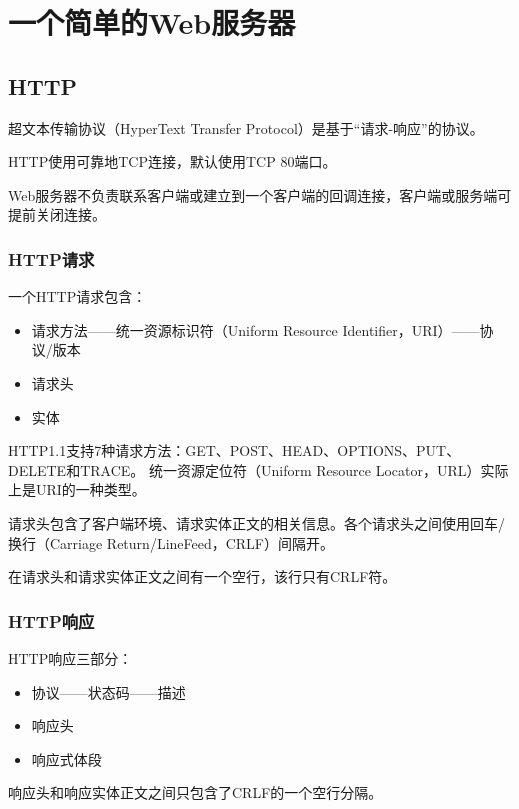 \chapter{一个简单的Web服务器}
\section{HTTP}
超文本传输协议（HyperText Transfer Protocol）是基于“请求-响应”的协议。
\par HTTP使用可靠地TCP连接，默认使用TCP 80端口。
\par Web服务器不负责联系客户端或建立到一个客户端的回调连接，客户端或服务端可提前关闭连接。
\subsection{HTTP请求}
一个HTTP请求包含：
\begin{itemize}
	\item 请求方法——统一资源标识符（Uniform Resource Identifier，URI）——协议/版本
	\item 请求头
	\item 实体
\end{itemize}
\par HTTP1.1支持7种请求方法：GET、POST、HEAD、OPTIONS、PUT、DELETE和TRACE。
统一资源定位符（Uniform Resource Locator，URL）实际上是URI的一种类型。
\par 请求头包含了客户端环境、请求实体正文的相关信息。各个请求头之间使用回车/换行（Carriage Return/LineFeed，CRLF）间隔开。
\par 在请求头和请求实体正文之间有一个空行，该行只有CRLF符。
\subsection{HTTP响应}
HTTP响应三部分：
\begin{itemize}
	\item 协议——状态码——描述
	\item 响应头
	\item 响应式体段
\end{itemize}
\par 响应头和响应实体正文之间只包含了CRLF的一个空行分隔。

